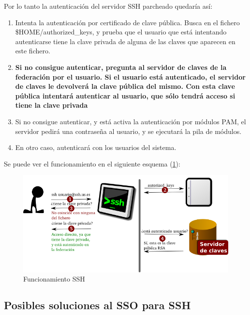     Por lo tanto la autenticación del servidor SSH parcheado quedaría así:

    \begin{enumerate}

    \item Intenta la autenticación por certificado de clave pública. Busca
    en el fichero \$HOME/authorized\_keys, y prueba que el usuario que está
    intentando autenticarse tiene la clave privada de alguna de las claves
    que aparecen en este fichero.

    \item \textbf{Si no consigue autenticar, pregunta al servidor de claves
    de la federación por el usuario. Si el usuario está autenticado, el
    servidor de claves le devolverá la clave pública del mismo. Con esta
    clave pública intentará autenticar al usuario, que sólo tendrá acceso
    si tiene la clave privada}

    \item Si no consigue autenticar, y está activa la autenticación por
    módulos PAM, el servidor pedirá una contraseña al usuario, y se
    ejecutará la pila de módulos.

    \item En otro caso, autenticará con los usuarios del sistema.

    \end{enumerate}

    Se puede ver el funcionamiento en el siguiente esquema
    (\ref{fig:funcionamientossh}):

    \begin{figure}[htp!]
        \centering
            \includegraphics[width=\textwidth]{img/funcionamientossh.png}
            \caption{Funcionamiento SSH}
        \label{fig:funcionamientossh}
    \end{figure}


        \subsection{Posibles soluciones al SSO para SSH}

